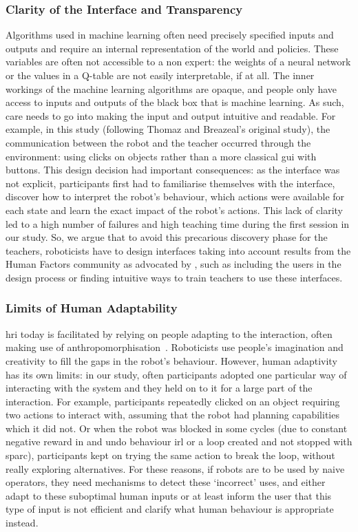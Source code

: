 \subsubsection{Clarity of the Interface and Transparency}

Algorithms used in machine learning often need precisely specified inputs and outputs and require an internal representation of the world and policies. These variables are often not accessible to a non expert: the weights of a neural network or the values in a Q-table are not easily interpretable, if at all. The inner workings of the machine learning algorithms are opaque, and people only have access to inputs and outputs of the black box that is machine learning. As such, care needs to go into making the input and output intuitive and readable. For example, in this study (following Thomaz and Breazeal's original study), the communication between the robot and the teacher occurred through the environment: using clicks on objects rather than a more classical \gls{gui} with buttons. This design decision had important consequences: as the interface was not explicit, participants first had to familiarise themselves with the interface, discover how to interpret the robot's behaviour, which actions were available for each state and learn the exact impact of the robot's actions. This lack of clarity led to a high number of failures and high teaching time during the first session in our study. So, we argue that to avoid this precarious discovery phase for the teachers, roboticists have to design interfaces taking into account results from the Human Factors community as advocated by \cite{adams2002critical}, such as including the users in the design process or finding intuitive ways to train teachers to use these interfaces.

\subsubsection{Limits of Human Adaptability}

\gls{hri} today is facilitated by relying on people adapting to the interaction, often making use of anthropomorphisation~\citep{fong2003survey,zlotowski2015anthropomorphism}. Roboticists use people's imagination and creativity to fill the gaps in the robot's behaviour. However, human adaptivity has its own limits: in our study, often participants adopted one particular way of interacting with the system and they held on to it for a large part of the interaction. For example, participants repeatedly clicked on an object requiring two actions to interact with, assuming that the robot had planning capabilities which it did not. Or when the robot was blocked in some cycles (due to constant negative reward in and undo behaviour \gls{irl} or a loop created and not stopped with \gls{sparc}), participants kept on trying the same action to break the loop, without really exploring alternatives. For these reasons, if robots are to be used by naive operators, they need mechanisms to detect these `incorrect' uses, and either adapt to these suboptimal human inputs or at least inform the user that this type of input is not efficient and clarify what human behaviour is appropriate instead.

